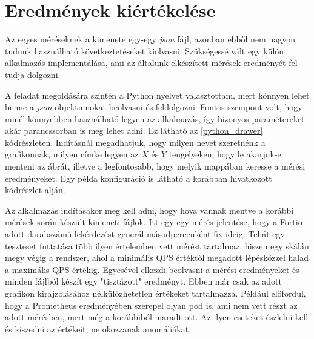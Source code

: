 \section{Eredmények kiértékelése}
Az egyes méréseknek a kimenete egy-egy \textit{json} fájl, azonban ebből nem nagyon tudunk használható következtetéseket kiolvasni. Szükségessé vált egy külön alkalmazás implementálása, ami az általunk elkészített mérések eredményét fel tudja dolgozni. 

A feladat megoldására szintén a Python nyelvet választottam, mert könnyen lehet benne a \textit{json} objektumokat beolvasni és feldolgozni.
Fontos szempont volt, hogy minél könnyebben használható legyen az alkalmazás, így bizonyos paramétereket akár parancssorban is meg lehet adni. Ez látható az \ref{python_drawer} kódrészleten. Indításnál megadhatjuk, hogy milyen nevet szeretnénk a grafikonnak, milyen címke legyen az $X$ és $Y$ tengelyeken, hogy le akarjuk-e menteni az ábrát, illetve a legfontosabb, hogy melyik mappában keresse a mérési eredményeket. Egy példa konfiguráció is látható a korábban hivatkozott kódrészlet alján. \\

\lstset{caption=Eredményeket feldolgozó alkalmazás használata, label=python_drawer}


Az alkalmazás indításakor meg kell adni, hogy hova vannak mentve a korábbi mérések során készült kimeneti fájlok. Itt egy-egy mérés jelentése, hogy a Fortio adott darabszámú lekérdezést generál másodpercenként fix ideig. Tehát egy teszteset futtatása több ilyen értelemben vett mérést tartalmaz, hiszen egy skálán megy végig a rendszer, ahol a minimális QPS értéktől megadott lépésközzel halad a maximális QPS értékig. 
Egyesével elkezdi beolvasni a mérési eredményeket és minden fájlból készít egy "tisztázott" eredményt. Ebben már csak az adott grafikon kirajzolásához nélkülözhetetlen értékeket tartalmazza. Például előfordul, hogy a Prometheus eredményében szerepel olyan pod is, ami nem vett részt az adott mérésben, mert még a korábbiból maradt ott. Az ilyen eseteket észlelni kell és kiszedni az értékeit, ne okozzanak anomáliákat. 

